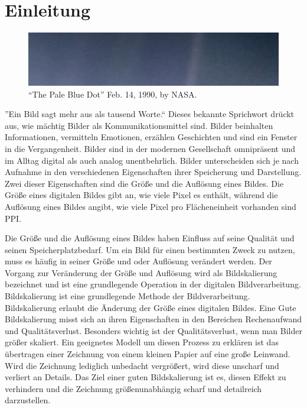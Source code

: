 



\chapter{Einleitung}
    
    \begin{center}
        \begin{figure}[h]
            \includegraphics[width=\textwidth]{img/PIA23645_PaleBlueDotRevisited_1600.jpg}
            \caption{``The Pale Blue Dot'' Feb. 14, 1990, by NASA\footnotemark.}
            \vspace{-6mm}
            \label{fig:my_label}
        \end{figure}
    \end{center}
    
    ''Ein Bild sagt mehr aus als tausend Worte.`` Dieses bekannte Sprichwort drückt aus, wie mächtig Bilder als Kommunikationsmittel sind. 
    Bilder beinhalten Informationen, vermitteln Emotionen, erzählen Geschichten und sind ein Fenster in die Vergangenheit. 
    Bilder sind in der modernen Gesellschaft omnipräsent und im Alltag digital als auch analog unentbehrlich.
    Bilder unterscheiden sich je nach Aufnahme in den verschiedenen Eigenschaften ihrer Speicherung und Darstellung. 
    Zwei dieser Eigenschaften sind die Größe und die Auflösung eines Bildes. 
    Die Größe eines digitalen Bildes gibt an, wie viele Pixel es enthält, während die Auflösung eines Bildes angibt, wie viele Pixel pro Flächeneinheit vorhanden sind \ac{PPI}.
    
    Die Größe und die Auflösung eines Bildes haben Einfluss auf seine Qualität und seinen Speicherplatzbedarf. 
    Um ein Bild für einen bestimmten Zweck zu nutzen, muss es häufig in seiner Größe und oder Auflösung verändert werden. 
    Der Vorgang zur Veränderung der Größe und Auflösung wird als Bildskalierung bezeichnet und ist eine grundlegende Operation in der digitalen Bildverarbeitung.
    Bildskalierung ist eine grundlegende Methode der Bildverarbeitung. Bildskalierung erlaubt die Änderung der Größe eines digitalen Bildes.
    Eine Gute Bildskalierung misst sich an ihren Eigenschaften in den Bereichen Rechenaufwand und Qualitätsverlust. 
    Besonders wichtig ist der Qualitätsverlust, wenn man Bilder größer skaliert. 
    Ein geeignetes Modell um diesen Prozess zu erklären ist das übertragen einer Zeichnung von einem kleinen Papier auf eine große Leinwand. 
    Wird die Zeichnung lediglich unbedacht vergrößert, wird diese unscharf und verliert an Details. 
    Das Ziel einer guten Bildskalierung ist es, diesen Effekt zu verhindern und die Zeichnung größenunabhängig scharf und detailreich darzustellen.
    
